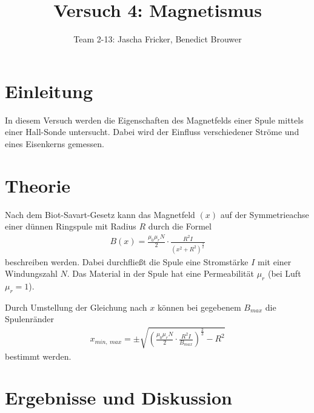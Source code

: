\documentclass[11pt, a4paper]{article}
\title{Versuch 4: Magnetismus}
\author{Team 2-13: Jascha Fricker, Benedict Brouwer}
\begin{document}
    \maketitle

    \tableofcontents

    \newpage

    \section{Einleitung}

    In diesem Versuch werden die Eigenschaften des Magnetfelds einer Spule mittels einer Hall-Sonde untersucht. Dabei wird der Einfluss verschiedener Ströme und eines Eisenkerns gemessen.

    \section{Theorie}

    Nach dem Biot-Savart-Gesetz kann das Magnetfeld $(x)$ auf der Symmetrieachse einer dünnen Ringspule mit Radius $R$ durch die Formel
    \begin{align}
        B(x) = \frac{\mu_0 \mu_r N}{2} \cdot \frac{R^2 I}{\left(x^2 + R^2\right)^{\frac{3}{2}}} \label{eq:BiotSavart}
    \end{align}
    beschreiben werden. Dabei durchfließt die Spule eine Stromstärke $I$ mit einer Windungszahl $N$. Das Material in der Spule hat eine Permeabilität $\mu_r$ (bei Luft $\mu_r = 1$).
    
    Durch Umstellung der Gleichung nach $x$ können bei gegebenem $B_{max}$ die Spulenränder
    \begin{align}
        x_{min, \ max} = \pm \sqrt{\left(\frac{\mu_0 \mu_r N}{2} \cdot \frac{R^2 I}{B_{max}}\right)^\frac{2}{3} - R^2} \label{eq:bmax}
    \end{align}
    bestimmt werden. 

    \section{Ergebnisse und Diskussion}
\end{document}
